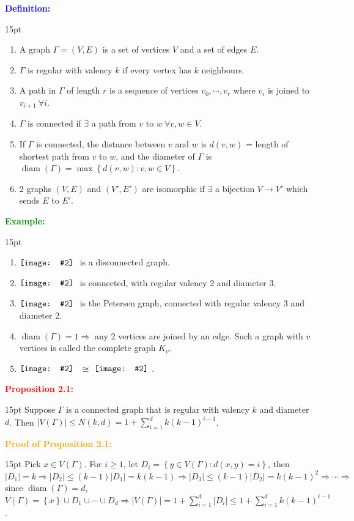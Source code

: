 \documentclass[12pt]{article}
\newcommand{\noparskip}{\vspace{-\parskip}}
\newenvironment{points}
	{\begin{enumerate}[label = (\arabic*)]}
	{\end{enumerate}}
\newenvironment{dent}
	{\begin{adjustwidth}{15pt}{}\noparskip}
	{\end{adjustwidth}}
\newenvironment{result}[1]
	{\textcolor{Red}{\textbf{#1:}}\begin{dent}}
	{\end{dent}}
\newenvironment{proof}[1]
	{\textcolor{Orange}{\textbf{Proof of #1:}}\begin{dent}}
	{\end{dent}}
\newenvironment{definition}
	{\textcolor{Blue}{\textbf{Definition:}}\begin{dent}}
	{\end{dent}}
\newenvironment{example}
	{\textcolor{Green}{\textbf{Example:}}\begin{dent}}
	{\end{dent}}
\newcommand{\pic}[2][1.0]{
	$\vcenter{\hbox{\texttt{[image: \#2]}\ }}$}
\renewcommand{\implies}{\Rightarrow}
\newcommand{\set}[1]{\left\{ #1 \right\}}
\newcommand{\sizeof}[1]{\left| #1 \right|}
\newcommand{\diam}[1]{\operatorname{diam}(#1)}
\begin{document}
\begin{definition}
\begin{points}
\item A graph $\Gamma = (V, E)$ is a set of vertices $V$ and a set of edges $E$.
\item $\Gamma$ is regular with valency $k$ if every vertex has $k$ neighbours.
\item A path in $\Gamma$ of length $r$ is a sequence of vertices $v_0, \cdots, v_r$ where $v_i$ is joined to $v_{i + 1}\ \forall i$.
\item $\Gamma$ is connected if $\exists$ a path from $v$ to $w\ \forall v, w \in V$.
\item If $\Gamma$ is connected, the distance between $v$ and $w$ is $d(v, w)$ = length of shortest path from $v$ to $w$, and the diameter of $\Gamma$ is $\diam{\Gamma} = \max \set{d(v, w): v, w \in V}$.
\item 2 graphs $(V, E)$ and $(V', E')$ are isomorphic if $\exists$ a bijection $V \rightarrow V'$ which sends $E$ to $E'$.
\end{points}
\end{definition}

\begin{example}
\begin{points}
\item \pic[0.15]{6.png} is a disconnected graph.
\item \pic[0.15]{2.png} is connected, with regular valency 2 and diameter 3.
\item \pic[0.15]{4.png} is the Petersen graph, connected with regular valency 3 and diameter 2.
\item $\diam{\Gamma} = 1 \implies$ any 2 vertices are joined by an edge. Such a graph with $v$ vertices is called the complete graph $K_v$.
\item \pic[0.15]{7.png} $\cong$ \pic[0.15]{8.png}.
\end{points}
\end{example}

\begin{result}{Proposition 2.1}
Suppose $\Gamma$ is a connected graph that is regular with valency $k$ and diameter $d$. Then $\sizeof{V(\Gamma)} \le N(k, d) = 1 + \sum_{i = 1}^d k(k - 1)^{i - 1}$.
\end{result}

\begin{proof}{Proposition 2.1}
Pick $x \in V(\Gamma)$. For $i \ge 1$, let $D_i = \set{y \in V(\Gamma): d(x, y) = i}$, then $\sizeof{D_1} = k \implies \sizeof{D_2} \le(k - 1) \sizeof{D_1} = k(k - 1) \implies \sizeof{D_3} \le(k - 1) \sizeof{D_2} = k(k - 1)^2 \implies \cdots \implies$ since $\diam{\Gamma} = d$, $V(\Gamma) = \set{x} \cup D_1 \cup \cdots \cup D_d \implies \sizeof{V(\Gamma)} = 1 + \sum_{i = 1}^d \sizeof{D_i} \le 1 + \sum_{i = 1}^d k(k - 1)^{i - 1}$.
\end{proof}
\end{document}
